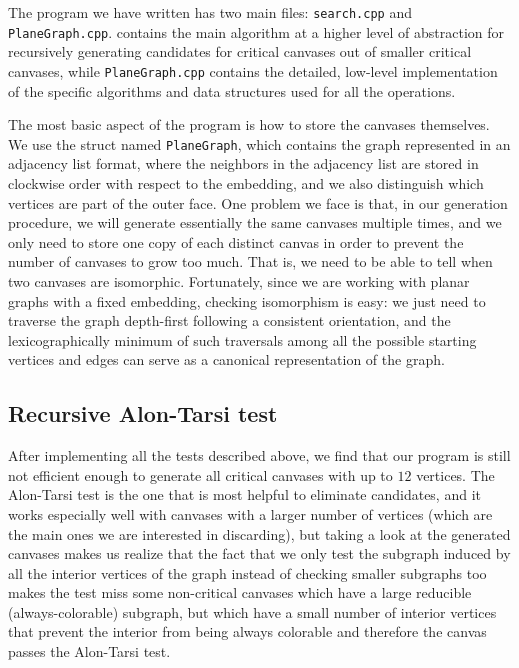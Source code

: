 \documentclass{article}
\begin{document}
The program we have written has two main files: \texttt{search.cpp} and \texttt{PlaneGraph.cpp}.  contains the main algorithm at a higher level of abstraction for recursively generating candidates for critical canvases out of smaller critical canvases, while \texttt{PlaneGraph.cpp} contains the detailed, low-level implementation of the specific algorithms and data structures used for all the operations.

The most basic aspect of the program is how to store the canvases themselves. We use the struct named \texttt{PlaneGraph}, which contains the graph represented in an adjacency list format, where the neighbors in the adjacency list are stored in clockwise order with respect to the embedding, and we also distinguish which vertices are part of the outer face. One problem we face is that, in our generation procedure, we will generate essentially the same canvases multiple times, and we only need to store one copy of each distinct canvas in order to prevent the number of canvases to grow too much. That is, we need to be able to tell when two canvases are isomorphic. Fortunately, since we are working with planar graphs with a fixed embedding, checking isomorphism is easy: we just need to traverse the graph depth-first following a consistent orientation, and the lexicographically minimum of such traversals among all the possible starting vertices and edges can serve as a canonical representation of the graph.

\subsection{Recursive Alon-Tarsi test}

After implementing all the tests described above, we find that our program is still not efficient enough to generate all critical canvases with up to $12$ vertices. The Alon-Tarsi test is the one that is most helpful to eliminate candidates, and it works especially well with canvases with a larger number of vertices (which are the main ones we are interested in discarding), but taking a look at the generated canvases makes us realize that the fact that we only test the subgraph induced by all the interior vertices of the graph instead of checking smaller subgraphs too makes the test miss some non-critical canvases which have a large reducible (always-colorable) subgraph, but which have a small number of interior vertices that prevent the interior from being always colorable and therefore the canvas passes the Alon-Tarsi test. 
\end{document}
